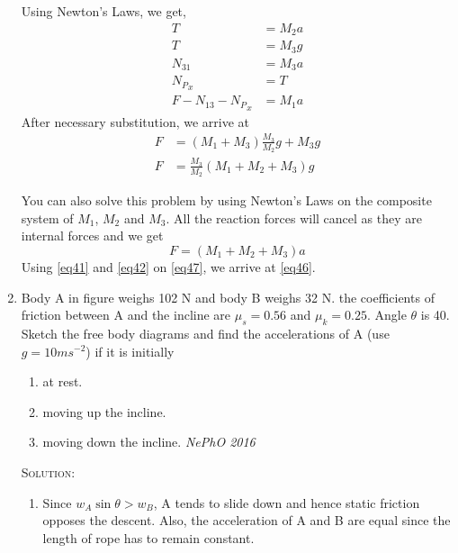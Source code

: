 \begin{enumerate}
Using Newton's Laws, we get,
\begin{align}
T&=M_2a \label{eq41}\\
T&=M_3g \label{eq42}\\
N_{31}&=M_3a \label{eq43}\\
{N_P}_x&=T \label{eq44}\\
F-N_{13}-{N_P}_x&=M_1a \label{eq45}
\end{align}
After necessary substitution, we arrive at
\begin{align}
F&=(M_1+M_3)\frac{M_3}{M_2}g+M_3g \nonumber\\
F&=\frac{M_3}{M_2}(M_1+M_2+M_3)g \label{eq46}
\end{align}
\begin{note}
You can also solve this problem by using Newton's Laws on the composite system of $M_1$, $M_2$ and $M_3$. All the reaction forces will cancel as they are internal forces and we get
\begin{equation}
F=(M_1+M_2+M_3)a \label{eq47}
\end{equation}
Using \eqref{eq41} and \eqref{eq42} on \eqref{eq47}, we arrive at \eqref{eq46}.
\end{note}

\item Body A in figure weighs 102 N and body B weighs 32 N. the coefficients of friction between A and the incline are $\mu_s=0.56$ and $\mu_k=0.25$. Angle $\theta$ is 40\degree. Sketch the free body diagrams and find the accelerations of A (use $g=10 \si{ms^{-2}}$) if it is initially 
\begin{enumerate}
\item at rest.
\item moving up the incline.
\item moving down the incline. \hfill \textsl{NePhO 2016}
\end{enumerate}
\begin{figure}[hbt]
    \centering
    
\end{figure}

\textsc{Solution:}
\begin{enumerate}
\item Since $w_A \sin \theta > w_B$, A tends to slide down and hence static friction opposes the descent. Also, the acceleration of A and B are equal since the length of rope has to remain constant.
\begin{figure}[!htb]
    \centering
    \begin{minipage}{.65 \textwidth}
        \centering
        
    \end{minipage}
    \begin{minipage}{.3 \textwidth}
        \centering
        
    \end{minipage}
\end{figure}


\end{enumerate}
\end{enumerate}
